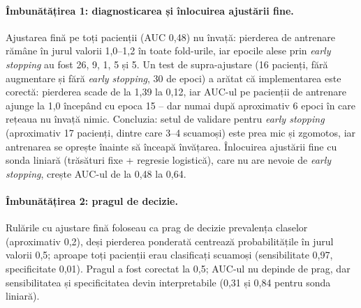 \documentclass[11pt, a4paper]{article}
\begin{document}
\paragraph{Îmbunătățirea 1: diagnosticarea și înlocuirea ajustării fine.} Ajustarea fină pe toți pacienții (AUC 0,48) nu învață: pierderea de antrenare rămâne în jurul valorii 1,0--1,2 în toate fold-urile, iar epocile alese prin \textit{early stopping} au fost 26, 9, 1, 5 și 5. Un test de supra-ajustare (16 pacienți, fără augmentare și fără \textit{early stopping}, 30 de epoci) a arătat că implementarea este corectă: pierderea scade de la 1,39 la 0,12, iar AUC-ul pe pacienții de antrenare ajunge la 1,0 începând cu epoca 15 -- dar numai după aproximativ 6 epoci în care rețeaua nu învață nimic. Concluzia: setul de validare pentru \textit{early stopping} (aproximativ 17 pacienți, dintre care 3--4 scuamoși) este prea mic și zgomotos, iar antrenarea se oprește înainte să înceapă învățarea. Înlocuirea ajustării fine cu sonda liniară (trăsături fixe + regresie logistică), care nu are nevoie de \textit{early stopping}, crește AUC-ul de la 0,48 la 0,64.

\paragraph{Îmbunătățirea 2: pragul de decizie.} Rulările cu ajustare fină foloseau ca prag de decizie prevalența claselor (aproximativ 0,2), deși pierderea ponderată centrează probabilitățile în jurul valorii 0,5; aproape toți pacienții erau clasificați scuamoși (sensibilitate 0,97, specificitate 0,01). Pragul a fost corectat la 0,5; AUC-ul nu depinde de prag, dar sensibilitatea și specificitatea devin interpretabile (0,31 și 0,84 pentru sonda liniară).
\end{document}

